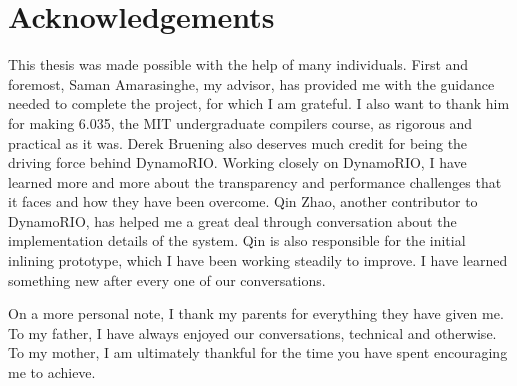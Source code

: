 \chapter*{Acknowledgements}

This thesis was made possible with the help of many individuals.  First and
foremost, Saman Amarasinghe, my advisor, has provided me with the guidance
needed to complete the project, for which I am grateful.  I also want to thank
him for making 6.035, the MIT undergraduate compilers course, as rigorous and
practical as it was.  Derek Bruening also deserves much credit for being the
driving force behind DynamoRIO.  Working closely on DynamoRIO, I have learned
more and more about the transparency and performance challenges that it faces
and how they have been overcome.  Qin Zhao, another contributor to DynamoRIO,
has helped me a great deal through conversation about the implementation details
of the system.  Qin is also responsible for the initial inlining prototype,
which I have been working steadily to improve.  I have learned something new
after every one of our conversations.

On a more personal note, I thank my parents for everything they have given me.
To my father, I have always enjoyed our conversations, technical and otherwise.
To my mother, I am ultimately thankful for the time you have spent encouraging
me to achieve.







